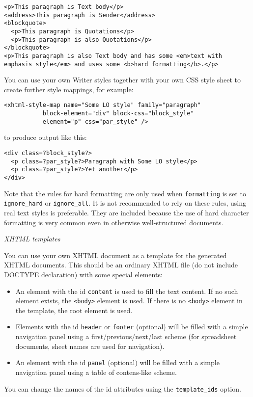 \documentclass{article}
\newcommand\textstyleSourceText[1]{\texttt{\textmd{#1}}}
\newcommand\liststyleLxiv{%
\renewcommand\labelitemi{{\textbullet}}
\renewcommand\labelitemii{${\circ}$}
\renewcommand\labelitemiii{${\blacksquare}$}
\renewcommand\labelitemiv{{\textbullet}}
}
\begin{document}
\begin{verbatim}
<p>This paragraph is Text body</p>
<address>This paragraph is Sender</address>
<blockquote>
  <p>This paragraph is Quotations</p>
  <p>This paragraph is also Quotations</p>
</blockquote>
<p>This paragraph is also Text body and has some <em>text with emphasis style</em> and uses some <b>hard formatting</b>.</p>
\end{verbatim}
{\mdseries
You can use your own Writer styles together with your own CSS style sheet to create further style mappings, for example:}

\begin{verbatim}
<xhtml-style-map name="Some LO style" family="paragraph"
           block-element="div" block-css="block_style"
           element="p" css="par_style" />
\end{verbatim}
{\mdseries
to produce output like this:}

\begin{verbatim}
<div class=?block_style?>
  <p class=?par_style?>Paragraph with Some LO style</p>
  <p class=?par_style?>Yet another</p>
</div>
\end{verbatim}
{\mdseries
Note that the rules for hard formatting are only used when \textstyleSourceText{formatting} is set to \textstyleSourceText{ignore\_hard} or \textstyleSourceText{ignore\_all}. It is not recommended to rely on these rules, using real text styles is preferable. They are included because the use of hard character formatting is very common even in otherwise well-structured documents.}

{\sffamily\mdseries\itshape
XHTML templates}

{\mdseries
You can use your own XHTML document as a template for the generated XHTML documents. This should be an ordinary XHTML file (do not include DOCTYPE declaration) with some special elements:}

\liststyleLxiv
\begin{itemize}
\item An element with the id \textstyleSourceText{content} is used to fill the text content. If no such element exists, the \textstyleSourceText{<body>} element is used. If there is no \textstyleSourceText{<body>} element in the template, the root element is used.
\item Elements with the id \textstyleSourceText{header} or \textstyleSourceText{footer} (optional) will be filled with a simple navigation panel using a first/previous/next/last scheme (for spreadsheet documents, sheet names are used for navigation).
\item An element with the id \textstyleSourceText{panel} (optional) will be filled with a simple navigation panel using a table of contens-like scheme.
\end{itemize}
{\mdseries
You can change the names of the id attributes using the \textstyleSourceText{template\_ids} option.}
\end{document}
